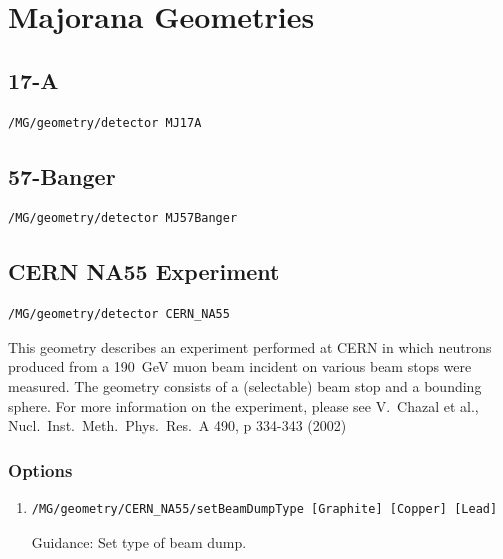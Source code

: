 \section{Majorana Geometries}

\subsection{17-A}
\begin{lstlisting}
/MG/geometry/detector MJ17A
\end{lstlisting}

\subsection{57-Banger}
\begin{lstlisting}
/MG/geometry/detector MJ57Banger
\end{lstlisting}

\subsection{CERN NA55 Experiment}
\begin{lstlisting}
/MG/geometry/detector CERN_NA55
\end{lstlisting}
This geometry describes an experiment performed at CERN in which neutrons
produced from a 190~GeV muon beam incident on various beam stops were
measured.  The geometry consists of a (selectable) beam stop and a bounding
sphere.  For more information on the experiment, please see 
V.~Chazal et al., Nucl.~Inst.~Meth.~Phys.~Res.~A 490, p 334-343 (2002)
\subsubsection{Options}
\begin{enumerate}
\item 
\begin{lstlisting}
/MG/geometry/CERN_NA55/setBeamDumpType [Graphite] [Copper] [Lead]
\end{lstlisting}
Guidance: Set type of beam dump.
\end{enumerate}

